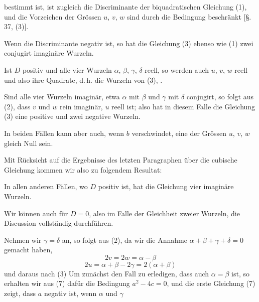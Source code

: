bestimmt ist, ist zugleich die Discriminante der biquadratischen Gleichung (1), und die Vorzeichen der Grössen $u$, $v$, $w$ sind durch die Bedingung
beschränkt [\S.\,37, (3)].

Wenn die Discriminante negativ ist, so hat die Gleichung (3) ebenso wie (1) zwei conjugirt imaginäre Wurzeln.

Ist $D$ positiv und alle vier Wurzeln $\alpha$, $\beta$, $\gamma$, $\delta$ reell, so werden auch $u$, $v$, $w$ reell und also ihre Quadrate, d.\,h. die Wurzeln von (3), .

Sind alle vier Wurzeln imaginär, etwa $\alpha$ mit $\beta$ und $\gamma$ mit $\delta$ conjugirt, so folgt aus (2), dass $v$ und $w$ rein imaginär, $u$ reell ist; also hat in diesem Falle die Gleichung (3) eine positive und zwei negative Wurzeln.

In beiden Fällen kann aber auch, wenn $b$ verschwindet, eine der Grössen $u$, $v$, $w$ gleich Null sein.

Mit Rücksicht auf die Ergebnisse des letzten Paragraphen über die cubische Gleichung kommen wir also zu folgendem Resultat:


In allen anderen Fällen, wo $D$ positiv ist, hat die Gleichung vier imaginäre Wurzeln.

Wir können auch für $D=0$, also im Falle der Gleichheit zweier Wurzeln, die Discussion vollständig durchführen.

Nehmen wir $\gamma = \delta$ an, so folgt aus (2), da wir die Annahme $\alpha+\beta+\gamma+\delta = 0$ gemacht haben,
\[
2v = 2w = \alpha - \beta
\]
\[
2u = \alpha+\beta-2\gamma = 2(\alpha+\beta)
\]
und daraus nach (3)
Um zunächst den Fall zu erledigen, dass auch $\alpha=\beta$ ist, so erhalten wir aus (7) dafür die Bedingung $a^2-4c=0$, und die erste Gleichung (7) zeigt, dass $a$ negativ ist, wenn $\alpha$ und $\gamma$
